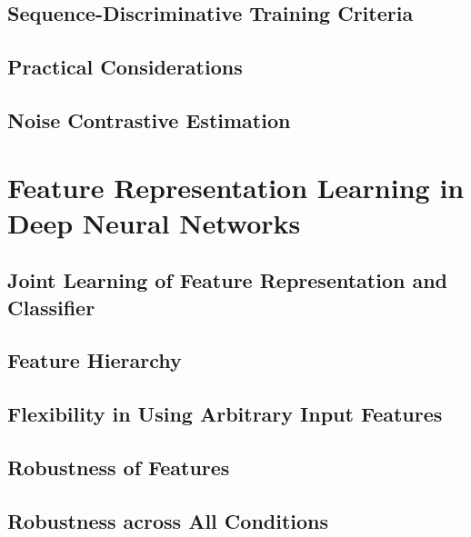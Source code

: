 \documentclass[a4paper]{article}
\begin{document}
\subsection{Sequence-Discriminative Training Criteria}

\subsection{Practical Considerations}

\subsection{Noise Contrastive Estimation}


\newpage
\section{Feature Representation Learning in Deep Neural Networks}
\subsection{Joint Learning of Feature Representation and Classifier}

\subsection{Feature Hierarchy}

\subsection{Flexibility in Using Arbitrary Input Features}

\subsection{Robustness of Features}

\subsection{Robustness across All Conditions}
\end{document}
